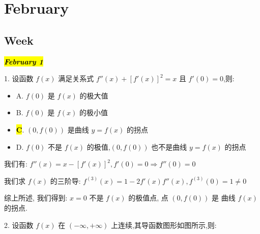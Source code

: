 \chapter{February}
\section{Week }
\hl{\textbf{\textit{February 1}}}

1. 设函数 $f(x)$ 满足关系式 $f''(x)+[f'(x)]^{2}=x$ 且 $f'(0)=0$,则:
\begin{itemize}
	\item A. $f(0)$ 是 $f(x)$ 的极大值
	\item B. $f(0)$ 是 $f(x)$ 的极小值
	\item \hl{\textbf{C}}. $(0,f(0))$ 是曲线 $y=f(x)$ 的拐点
	\item D. $f(0)$ 不是 $f(x)$ 的极值,$(0,f(0))$ 也不是曲线 $y=f(x)$ 的拐点
\end{itemize}
\begin{solution}

	我们有: $f''(x) = x - [f'(x)]^{2}, f'(0) = 0\Rightarrow f''(0) = 0$
	
	我们求 $f(x)$ 的三阶导: $f^{(3)}(x) = 1 - 2f'(x)f''(x), f^{(3)}(0) = 1\neq 0$

	综上所述, 我们得到: $x=0$ 不是 $f(x)$ 的极值点, 点 $(0,f(0))$ 是 曲线 $f(x)$ 的拐点. 
\end{solution}

2. 设函数 $f(x)$ 在 $(-\infty,+\infty)$ 上连续,其导函数图形如图所示,则:

